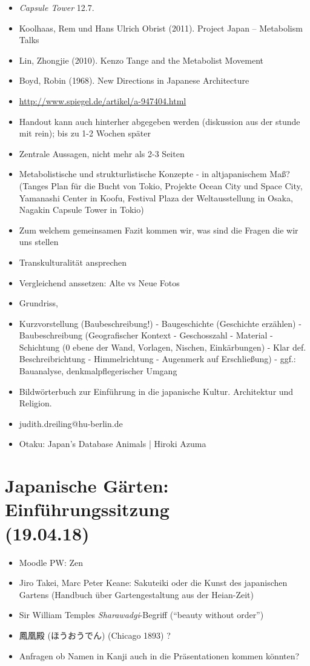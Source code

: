 \documentclass[emulatestandardclasses]{scrartcl}
\begin{document}
\begin{itemize}
  \item \emph{Capsule Tower} 12.7.
  \item Koolhaas, Rem und Hans Ulrich Obrist (2011). Project Japan – Metabolism Talks
  \item Lin, Zhongjie (2010). Kenzo Tange and the Metabolist Movement
  \item Boyd, Robin (1968). New Directions in Japanese Architecture
  \item \url{http://www.spiegel.de/artikel/a-947404.html}
  \item Handout kann auch hinterher abgegeben werden (diskussion aus der stunde mit rein); bis zu 1-2 Wochen später
  \item Zentrale Aussagen, nicht mehr als 2-3 Seiten
  \item Metabolistische und strukturlistische Konzepte - in altjapanischem Maß? (Tanges Plan für die Bucht von Tokio, Projekte Ocean City und Space City, Yamanashi Center in Koofu, Festival Plaza der Weltausstellung in Osaka, Nagakin Capsule Tower in Tokio)
  \item Zum welchem gemeinsamen Fazit kommen wir, was sind die Fragen die wir uns stellen
  \item Transkulturalität ansprechen
  \item Vergleichend anssetzen: Alte vs Neue Fotos
  \item Grundriss,
  \item Kurzvorstellung (Baubeschreibung!) - Baugeschichte (Geschichte erzählen) - Baubeschreibung (Geografischer Kontext - Geschosszahl - Material - Schichtung (0 ebene der Wand, Vorlagen, Nischen, Einkärbungen) - Klar def. Beschreibrichtung - Himmelrichtung - Augenmerk auf Erschließung) - ggf.: Bauanalyse, denkmalpflegerischer Umgang
  \item Bildwörterbuch zur Einführung in die japanische Kultur. Architektur und Religion. 
  \item judith.dreiling@hu-berlin.de
  \item Otaku: Japan's Database Animals | Hiroki Azuma
\end{itemize}


\section{Japanische Gärten: Einführungssitzung\\(19.04.18)}

\begin{itemize}
  \item Moodle PW: Zen
  \item Jiro Takei, Marc Peter Keane: Sakuteiki oder die Kunst des japanischen Gartens (Handbuch über Gartengestaltung aus der Heian-Zeit)
  \item Sir William Temples \emph{Sharawadgi}-Begriff ("`beauty without order"')
  \item 鳳凰殿 (ほうおうでん) (Chicago 1893) ?
  \item Anfragen ob Namen in Kanji auch in die Präsentationen kommen könnten?
\end{itemize}
\end{document}
